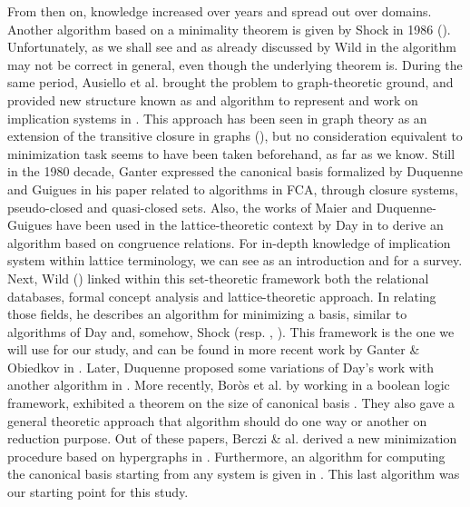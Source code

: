 \vspace{1.2em}

From then on, knowledge increased over years and spread out over domains. 
Another algorithm based on a minimality theorem is given by Shock in 1986 
(\cite{shock_computing_1986}). Unfortunately, as we shall see and as already 
discussed by Wild in \cite{wild_computations_1995} the algorithm may not be
correct in general, even though the underlying theorem is. During the same 
period, Ausiello et al. brought the problem to graph-theoretic ground, and 
provided new structure known as  and algorithm to represent 
and work on implication systems in \cite{ausiello_directed_2017, 
	ausiello_graph_1983, ausiello_minimal_1986}. This approach has been seen in 
graph theory as an extension of the transitive closure in graphs 
(\cite{aho_transitive_2006}), but no consideration equivalent to minimization 
task seems to have been taken beforehand, as far as we know. Still in the 1980 
decade, Ganter expressed the canonical basis formalized by Duquenne and Guigues 
in his paper related to algorithms in FCA, \cite{ganter_two_2010} through 
closure systems, pseudo-closed and quasi-closed sets. Also, the works of Maier and Duquenne-Guigues have been used in the lattice-theoretic context by Day in 
\cite{day_lattice_1992} to derive an algorithm based on congruence relations. 
For in-depth knowledge of implication system within lattice terminology, we can 
see \cite{davey_introduction_2002} as an introduction and 
\cite{bertet_lattices_2016} for a survey. Next, Wild  (\cite{wild_implicational_1989, wild_theory_1994, wild_computations_1995}) 
linked within this set-theoretic framework both the relational databases, 
formal concept analysis and lattice-theoretic approach. In relating those 
fields, he describes an algorithm for minimizing a basis, similar to algorithms 
of Day and, somehow, Shock (resp. \cite{day_lattice_1992},  
\cite{shock_computing_1986}). This framework is the one we will use for our 
study, and can be found in more recent work by Ganter \& Obiedkov in 
\cite{ganter_conceptual_2016}. Later, Duquenne proposed some 
variations of Day's work with another algorithm in 
\cite{duquenne_variations_2007}. More recently, Bor\`os et al. by 
working in a boolean logic framework, exhibited a theorem on the size of
canonical basis \cite{boros_exclusive_2010, boros_strong_2017}. They also gave
a general theoretic approach that algorithm should do one way or another on
reduction purpose. Out of these papers, Berczi \& al. derived a new 
minimization procedure based on hypergraphs in \cite{berczi_directed_2017}. 
Furthermore, an algorithm for computing the canonical basis starting from any 
system is given in \cite{ganter_conceptual_2016}. This last algorithm was our starting point for this study.

